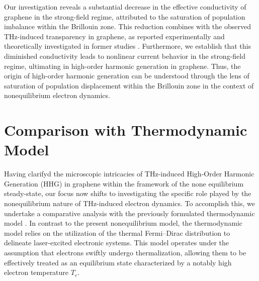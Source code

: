Our investigation reveals a substantial decrease in the effective conductivity of graphene in the strong-field regime, attributed to the saturation of population imbalance within the Brillouin zone. This reduction combines with the observed THz-induced transparency in graphene, as reported experimentally \cite{Hwang2013, Paul_2013, doi:10.1063/1.4902999} and theoretically investigated in former studies \cite{sato2021nonlinear}. Furthermore, we establish that this diminished conductivity leads to nonlinear current behavior in the strong-field regime, ultimating in high-order harmonic generation in graphene. Thus, the origin of high-order harmonic generation can be understood through the lens of saturation of population displacement within the Brillouin zone in the context of nonequilibrium electron dynamics.
\section{Comparison with Thermodynamic Model \label{sec:thermo}}
Having clarifyd the microscopic intricacies of THz-induced High-Order Harmonic Generation (HHG) in graphene within the framework of the none equilibrium steady-state, our focus now shifts to investigating the specific role played by the nonequilibrium nature of THz-induced electron dynamics. To accomplish this, we undertake a comparative analysis with the previously formulated thermodynamic model \cite{mics2015thermodynamic}. In contrast to the present nonequilibrium model, the thermodynamic model relies on the utilization of the thermal Fermi--Dirac distribution to delineate laser-excited electronic systems. This model operates under the assumption that electrons swiftly undergo thermalization, allowing them to be effectively treated as an equilibrium state characterized by a notably high electron temperature $T_e$.

